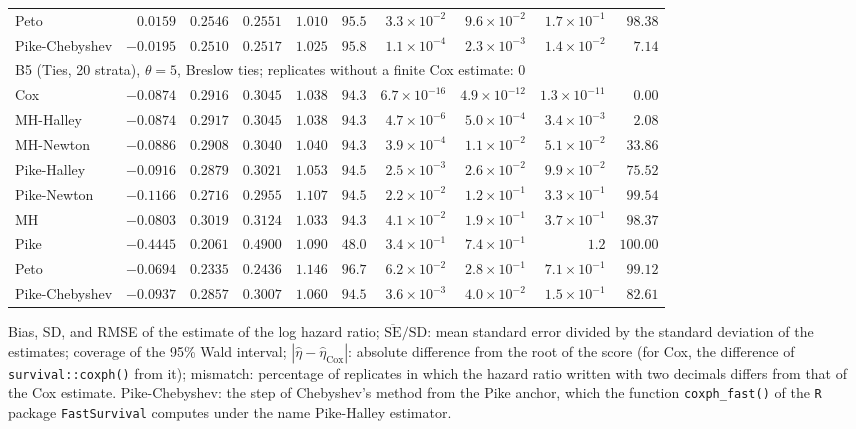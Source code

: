\begin{landscape}
\begin{longtable}{lrrrrrrrrr}
Peto & $0.0159$ & $0.2546$ & $0.2551$ & $1.010$ & $95.5$ & $3.3 \times 10^{-2}$ & $9.6 \times 10^{-2}$ & $1.7 \times 10^{-1}$ & $98.38$ \\
Pike-Chebyshev & $-0.0195$ & $0.2510$ & $0.2517$ & $1.025$ & $95.8$ & $1.1 \times 10^{-4}$ & $2.3 \times 10^{-3}$ & $1.4 \times 10^{-2}$ & $7.14$ \\
\multicolumn{10}{l}{B5 (Ties, 20 strata), $\theta = 5$, Breslow ties; replicates without a finite Cox estimate: 0} \\
Cox & $-0.0874$ & $0.2916$ & $0.3045$ & $1.038$ & $94.3$ & $6.7 \times 10^{-16}$ & $4.9 \times 10^{-12}$ & $1.3 \times 10^{-11}$ & $0.00$ \\
MH-Halley & $-0.0874$ & $0.2917$ & $0.3045$ & $1.038$ & $94.3$ & $4.7 \times 10^{-6}$ & $5.0 \times 10^{-4}$ & $3.4 \times 10^{-3}$ & $2.08$ \\
MH-Newton & $-0.0886$ & $0.2908$ & $0.3040$ & $1.040$ & $94.3$ & $3.9 \times 10^{-4}$ & $1.1 \times 10^{-2}$ & $5.1 \times 10^{-2}$ & $33.86$ \\
Pike-Halley & $-0.0916$ & $0.2879$ & $0.3021$ & $1.053$ & $94.5$ & $2.5 \times 10^{-3}$ & $2.6 \times 10^{-2}$ & $9.9 \times 10^{-2}$ & $75.52$ \\
Pike-Newton & $-0.1166$ & $0.2716$ & $0.2955$ & $1.107$ & $94.5$ & $2.2 \times 10^{-2}$ & $1.2 \times 10^{-1}$ & $3.3 \times 10^{-1}$ & $99.54$ \\
MH & $-0.0803$ & $0.3019$ & $0.3124$ & $1.033$ & $94.3$ & $4.1 \times 10^{-2}$ & $1.9 \times 10^{-1}$ & $3.7 \times 10^{-1}$ & $98.37$ \\
Pike & $-0.4445$ & $0.2061$ & $0.4900$ & $1.090$ & $48.0$ & $3.4 \times 10^{-1}$ & $7.4 \times 10^{-1}$ & $1.2$ & $100.00$ \\
Peto & $-0.0694$ & $0.2335$ & $0.2436$ & $1.146$ & $96.7$ & $6.2 \times 10^{-2}$ & $2.8 \times 10^{-1}$ & $7.1 \times 10^{-1}$ & $99.12$ \\
Pike-Chebyshev & $-0.0937$ & $0.2857$ & $0.3007$ & $1.060$ & $94.5$ & $3.6 \times 10^{-3}$ & $4.0 \times 10^{-2}$ & $1.5 \times 10^{-1}$ & $82.61$ \\
\end{longtable}
Bias, SD, and RMSE of the estimate of the log hazard ratio; $\overline{\mathrm{SE}}/\mathrm{SD}$: mean standard error divided by the standard deviation of the estimates; coverage of the 95\% Wald interval; $|\hat{\eta} - \hat{\eta}_{\mathrm{Cox}}|$: absolute difference from the root of the score (for Cox, the difference of \texttt{survival::coxph()} from it); mismatch: percentage of replicates in which the hazard ratio written with two decimals differs from that of the Cox estimate. Pike-Chebyshev: the step of Chebyshev's method from the Pike anchor, which the function \texttt{coxph\_fast()} of the \texttt{R} package \texttt{FastSurvival} computes under the name Pike-Halley estimator.\par
\endgroup
\end{landscape}
